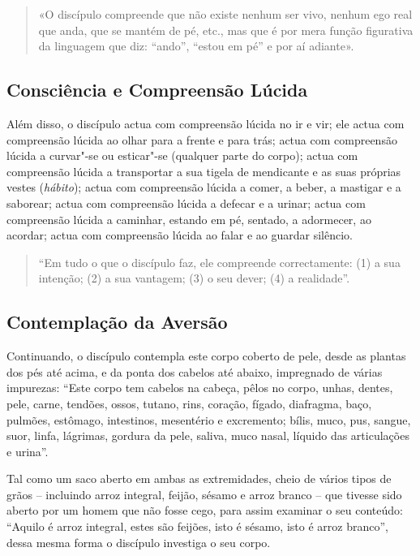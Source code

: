 \begin{quote}
  «O discípulo compreende que não existe nenhum ser vivo, nenhum ego real que
  anda, que se mantém de pé, etc., mas que é por mera função figurativa da
  linguagem que diz: “ando”, “estou em pé” e por aí adiante».
\end{quote}

\subsection{Consciência e Compreensão Lúcida}


Além disso, o discípulo actua com compreensão lúcida no ir e vir; ele actua com
compreensão lúcida ao olhar para a frente e para trás; actua com compreensão
lúcida a curvar"-se ou esticar"-se (qualquer parte do corpo); actua com
compreensão lúcida a transportar a sua tigela de mendicante e as suas próprias
vestes (\emph{hábito}); actua com compreensão lúcida a comer, a beber, a
mastigar e a saborear; actua com compreensão lúcida a defecar e a urinar; actua
com compreensão lúcida a caminhar, estando em pé, sentado, a adormecer, ao
acordar; actua com compreensão lúcida ao falar e ao guardar silêncio.


\enlargethispage{\baselineskip}

\begin{quote}
  “Em tudo o que o discípulo faz, ele compreende correctamente: (1) a sua
  intenção; (2) a sua vantagem; (3) o seu dever; (4) a realidade”.
\end{quote}

\subsection{Contemplação da Aversão}


Continuando, o discípulo contempla este corpo coberto de pele, desde as plantas
dos pés até acima, e da ponta dos cabelos até abaixo, impregnado de várias
impurezas: “Este corpo tem cabelos na cabeça, pêlos no corpo, unhas, dentes,
pele, carne, tendões, ossos, tutano, rins, coração, fígado, diafragma, baço,
pulmões, estômago, intestinos, mesentério e excremento; bílis, muco, pus,
sangue, suor, linfa, lágrimas, gordura da pele, saliva, muco nasal, líquido das
articulações e urina”.

Tal como um saco aberto em ambas as extremidades, cheio de vários tipos de grãos
-- incluindo arroz integral, feijão, sésamo e arroz branco -- que tivesse sido
aberto por um homem que não fosse cego, para assim examinar o seu conteúdo:
“Aquilo é arroz integral, estes são feijões, isto é sésamo, isto é arroz
branco”, dessa mesma forma o discípulo investiga o seu corpo.

